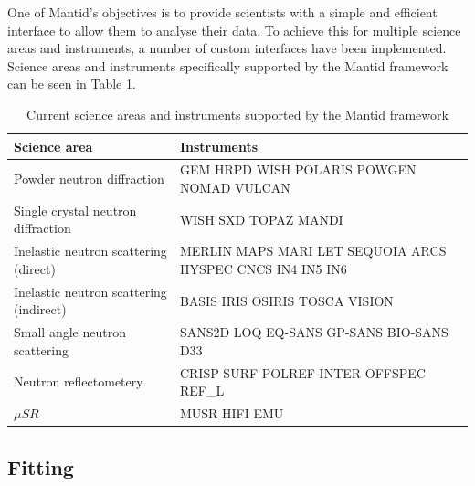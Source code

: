 \documentclass[1p]{elsarticle}
\begin{document}
One of Mantid's objectives is to provide scientists with a simple and efficient interface to allow them to analyse their data.  To achieve this for multiple science areas and instruments, a number of custom interfaces have been implemented. 
Science areas and instruments specifically supported by the Mantid framework can be seen in Table \ref{coverage}.



\begin{table}[!htdp]

\footnotesize
\begin{tabular}{p{} |  p{} }
Science area &Instruments \\ \hline
Powder neutron diffraction&GEM HRPD WISH POLARIS POWGEN NOMAD VULCAN\\
Single crystal neutron diffraction&WISH SXD TOPAZ MANDI\\
Inelastic neutron scattering (direct)&MERLIN MAPS MARI LET SEQUOIA ARCS HYSPEC CNCS IN4 IN5 IN6 \\
Inelastic neutron scattering (indirect)&BASIS IRIS OSIRIS TOSCA VISION\\
Small angle neutron scattering &SANS2D LOQ EQ-SANS GP-SANS BIO-SANS D33\\
Neutron reflectometery&CRISP SURF POLREF INTER OFFSPEC REF\_L\\
$\mu SR$&MUSR HIFI EMU\\
\end{tabular}
\caption{Current science areas and instruments supported by the Mantid framework}
\label{coverage}
\end{table}




\subsection {Fitting}
\end{document}
